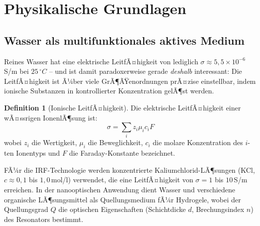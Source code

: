 ﻿\documentclass[a4paper,12pt]{scrreprt}
\theoremstyle{definition}
\newtheorem{definition}{Definition}[section]
\begin{document}
\section{Physikalische Grundlagen}

\subsection{Wasser als multifunktionales aktives Medium}

Reines Wasser hat eine elektrische LeitfÃ¤higkeit von lediglich
$\sigma \approx 5{,}5 \times 10^{-6}$\,S/m bei $25\,^{\circ}C$ -- und ist damit
paradoxerweise gerade \emph{deshalb} interessant: Die LeitfÃ¤higkeit ist
Ã¼ber viele GrÃ¶ÃŸenordnungen prÃ¤zise einstellbar, indem ionische Substanzen in
kontrollierter Konzentration gelÃ¶st werden.

\begin{definition}[Ionische LeitfÃ¤higkeit]
  Die elektrische LeitfÃ¤higkeit einer wÃ¤ssrigen IonenlÃ¶sung ist:
  \begin{equation}
    \sigma = \sum_i z_i \mu_i c_i F
    \label{eq:leitfaehigkeit}
  \end{equation}
  wobei $z_i$ die Wertigkeit, $\mu_i$ die Beweglichkeit, $c_i$ die molare
  Konzentration des $i$-ten Ionentyps und $F$ die Faraday-Konstante bezeichnet.
\end{definition}

FÃ¼r die IRF-Technologie werden konzentrierte Kaliumchlorid-LÃ¶sungen
(KCl, $c \approx 0{,}1$ bis $1{,}0$\,mol/l) verwendet, die eine LeitfÃ¤higkeit
von $\sigma = 1$ bis $10$\,S/m erreichen. In der nanooptischen Anwendung
dient Wasser und verschiedene organische LÃ¶sungsmittel als Quellungsmedium
fÃ¼r Hydrogele, wobei der Quellungsgrad $Q$ die optischen Eigenschaften
(Schichtdicke $d$, Brechungsindex $n$) des Resonators bestimmt.
\end{document}
